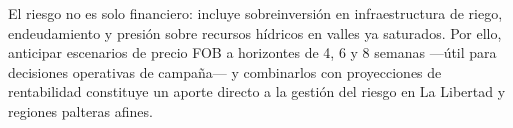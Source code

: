 El riesgo no es solo financiero: incluye sobreinversi\'on en infraestructura de riego, endeudamiento y presi\'on sobre recursos h\'idricos en valles ya saturados. Por ello, anticipar escenarios de precio FOB a horizontes de 4, 6 y 8 semanas ---\'util para decisiones operativas de campa\~na--- y combinarlos con proyecciones de rentabilidad constituye un aporte directo a la gesti\'on del riesgo en La Libertad y regiones palteras afines.
